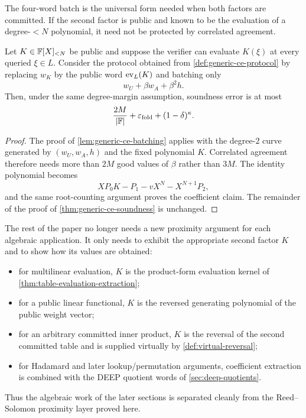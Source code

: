 The four-word batch is the universal form needed when both factors are committed.  If the second factor is public and known to be the evaluation of a degree-$<N$ polynomial, it need not be protected by correlated agreement.

\begin{corollary}
\label{cor:public-kernel-specialization}
Let $K\in\mathbb{F}[X]_{<N}$ be public and suppose the verifier can evaluate $K(\xi)$ at every queried $\xi\in L$.  Consider the protocol obtained from \cref{def:generic-ce-protocol} by replacing $w_K$ by the public word $\operatorname{ev}_L(K)$ and batching only
\begin{equation}
  w_U+\beta w_A+\beta^2h.
  \label{eq:public-kernel-batch}
\end{equation}
Then, under the same degree-margin assumption, soundness error is at most
\begin{equation}
  \frac{2M}{|\mathbb{F}|}
  +\varepsilon_{\mathrm{fold}}
  +(1-\delta)^\kappa.
  \label{eq:public-kernel-soundness}
\end{equation}
\end{corollary}

\begin{proof}
The proof of \cref{lem:generic-ce-batching} applies with the degree-$2$ curve generated by $(w_U,w_A,h)$ and the fixed polynomial $K$.  Correlated agreement therefore needs more than $2M$ good values of $\beta$ rather than $3M$.  The identity polynomial becomes
\[
  XP_0K-P_1-vX^N-X^{N+1}P_2,
\]
and the same root-counting argument proves the coefficient claim.  The remainder of the proof of \cref{thm:generic-ce-soundness} is unchanged.
\end{proof}

\begin{remark}
\label{rem:generic-ce-roadmap}
The rest of the paper no longer needs a new proximity argument for each algebraic application.  It only needs to exhibit the appropriate second factor $K$ and to show how its values are obtained:
\begin{itemize}[leftmargin=*]
  \item for multilinear evaluation, $K$ is the product-form evaluation kernel of \cref{thm:table-evaluation-extraction};
  \item for a public linear functional, $K$ is the reversed generating polynomial of the public weight vector;
  \item for an arbitrary committed inner product, $K$ is the reversal of the second committed table and is supplied virtually by \cref{def:virtual-reversal};
  \item for Hadamard and later lookup/permutation arguments, coefficient extraction is combined with the DEEP quotient words of \cref{sec:deep-quotients}.
\end{itemize}
Thus the algebraic work of the later sections is separated cleanly from the Reed--Solomon proximity layer proved here.
\end{remark}
